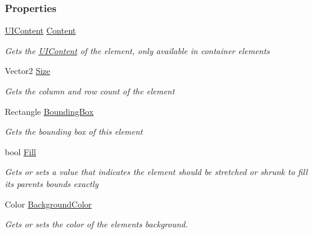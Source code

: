 \subsubsection*{Properties}
\begin{DoxyCompactItemize}
\item 
\hyperlink{class_m_b2_d_1_1_u_i_1_1_u_i_content}{U\+I\+Content} \hyperlink{class_m_b2_d_1_1_u_i_1_1_u_i_element_aa8ea5b853315a074a1a745c54c83404f}{Content}
\begin{DoxyCompactList}\small\item\em Gets the \hyperlink{class_m_b2_d_1_1_u_i_1_1_u_i_content}{U\+I\+Content} of the element, only available in container elements \end{DoxyCompactList}\item 
Vector2 \hyperlink{class_m_b2_d_1_1_u_i_1_1_u_i_element_a0de3ac5ae7a1377b62677a9aeae8955e}{Size}
\begin{DoxyCompactList}\small\item\em Gets the column and row count of the element \end{DoxyCompactList}\item 
Rectangle \hyperlink{class_m_b2_d_1_1_u_i_1_1_u_i_element_a840da120eb79b7ce0382e6c0a9d0a482}{Bounding\+Box}
\begin{DoxyCompactList}\small\item\em Gets the bounding box of this element \end{DoxyCompactList}\item 
bool \hyperlink{class_m_b2_d_1_1_u_i_1_1_u_i_element_a4bd0871f3e17f95b35aef3f3292bd89e}{Fill}
\begin{DoxyCompactList}\small\item\em Gets or sets a value that indicates the element should be stretched or shrunk to fill its parents bounds exactly \end{DoxyCompactList}\item 
Color \hyperlink{class_m_b2_d_1_1_u_i_1_1_u_i_element_abcd3eabd4db0998955a1e856a41d3d84}{Background\+Color}
\begin{DoxyCompactList}\small\item\em Gets or sets the color of the elements background. \end{DoxyCompactList}\item 

\end{DoxyCompactItemize}
